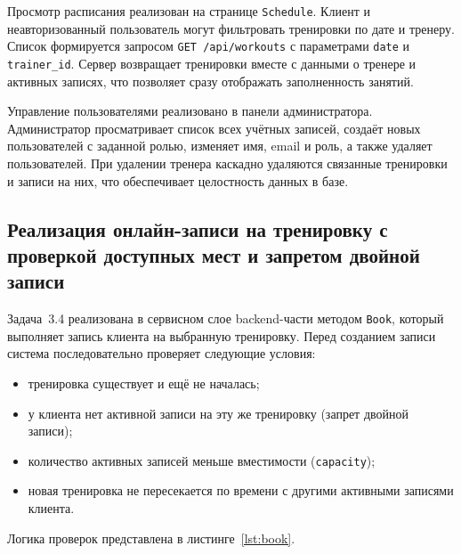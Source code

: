 Просмотр расписания реализован на странице \texttt{Schedule}. Клиент и
неавторизованный пользователь могут фильтровать тренировки по дате и тренеру.
Список формируется запросом \texttt{GET /api/workouts} с параметрами
\texttt{date} и \texttt{trainer\_id}. Сервер возвращает тренировки вместе
с данными о тренере и активных записях, что позволяет сразу отображать
заполненность занятий.

Управление пользователями реализовано в панели администратора. Администратор
просматривает список всех учётных записей, создаёт новых пользователей с
заданной ролью, изменяет имя, email и роль, а также удаляет пользователей.
При удалении тренера каскадно удаляются связанные тренировки и записи на них,
что обеспечивает целостность данных в базе.

\subsection{Реализация онлайн-записи на тренировку с проверкой доступных мест и запретом двойной записи}

Задача~3.4 реализована в сервисном слое backend-части методом \texttt{Book},
который выполняет запись клиента на выбранную тренировку. Перед созданием
записи система последовательно проверяет следующие условия:
\begin{itemize}
  \item тренировка существует и ещё не началась;
  \item у клиента нет активной записи на эту же тренировку (запрет двойной записи);
  \item количество активных записей меньше вместимости (\texttt{capacity});
  \item новая тренировка не пересекается по времени с другими активными
        записями клиента.
\end{itemize}

Логика проверок представлена в листинге~\ref{lst:book}.
\clearpage

